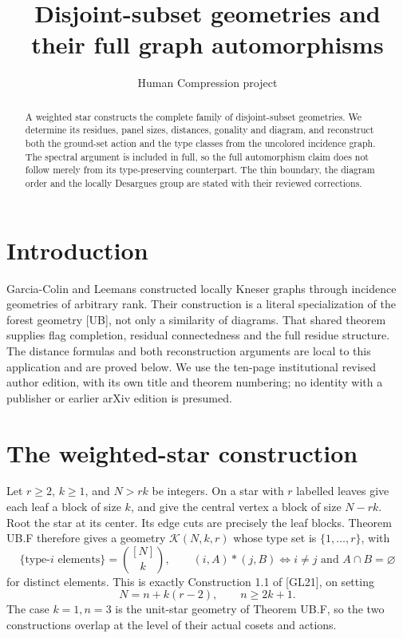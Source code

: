 
\title{Disjoint-subset geometries and their full graph automorphisms}
\author{Human Compression project}
\date{}

\maketitle
\begin{abstract}
A weighted star constructs the complete family of disjoint-subset geometries. We determine its residues, panel sizes, distances, gonality and diagram, and reconstruct both the ground-set action and the type classes from the uncolored incidence graph. The spectral argument is included in full, so the full automorphism claim does not follow merely from its type-preserving counterpart. The thin boundary, the diagram order and the locally Desargues group are stated with their reviewed corrections.
\end{abstract}
\section{Introduction}
Garcia-Colin and Leemans constructed locally Kneser graphs through incidence geometries of arbitrary rank. Their construction is a literal specialization of the forest geometry [UB], not only a similarity of diagrams. That shared theorem supplies flag completion, residual connectedness and the full residue structure. The distance formulas and both reconstruction arguments are local to this application and are proved below. We use the ten-page institutional revised author edition, with its own title and theorem numbering; no identity with a publisher or earlier arXiv edition is presumed.
\section{The weighted-star construction}
Let \(r\geq2\), \(k\geq1\), and \(N>rk\) be integers. On a star with \(r\) labelled leaves give each leaf a block of size \(k\), and give the central vertex a block of size \(N-rk\). Root the star at its center. Its edge cuts are precisely the leaf blocks. Theorem UB.F therefore gives a geometry \(\mathcal K(N,k,r)\) whose type set is \(\{1,\ldots,r\}\), with \begin{equation}
\{\text{type-}i\text{ elements}\}=\binom{[N]}k,
\qquad (i,A)*(j,B)\iff i\ne j\text{ and }A\cap B=\varnothing
\label{eq:disjoint-subset-geometries:7-1}
\end{equation} for distinct elements. This is exactly Construction 1.1 of {[}GL21{]}, on setting \begin{equation}
N=n+k(r-2),\qquad n\geq2k+1.
\label{eq:disjoint-subset-geometries:7-2}
\end{equation} The case \(k=1,n=3\) is the unit-star geometry of Theorem UB.F, so the two constructions overlap at the level of their actual cosets and actions.

